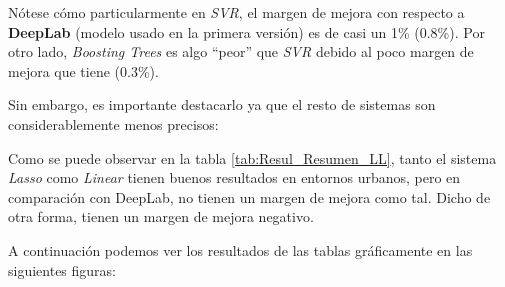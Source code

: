 Nótese cómo particularmente en \textit{\ac{SVR}}, el margen de mejora con respecto a \textbf{DeepLab} (modelo usado en la primera versión) es de casi un 1\% (0.8\%). Por otro lado, \textit{Boosting Trees} es algo ``peor'' que \textit{\ac{SVR}} debido al poco margen de mejora que tiene (0.3\%).

Sin embargo, es importante destacarlo ya que el resto de sistemas son considerablemente menos precisos:

\begin{table}[H]
\centering
{}
\caption{Resultados de Lasso y Linear}
\label{tab:Resul_Resumen_LL}
\end{table}

Como se puede observar en la tabla \ref{tab:Resul_Resumen_LL}, tanto el sistema \textit{Lasso} como \textit{Linear} tienen buenos resultados en entornos urbanos, pero en comparación con DeepLab, no tienen un margen de mejora como tal. Dicho de otra forma, tienen un margen de mejora negativo.

A continuación podemos ver los resultados de las tablas gráficamente en las siguientes figuras:

